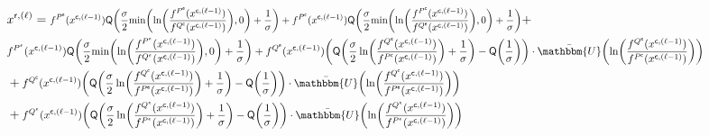 \documentclass[journal]{IEEEtran}
\newcommand{\mep}{{x}}
\newcommand{\row}{\mathsf{r}}
\newcommand{\col}{\mathsf{c}}
\newcommand{\Q}{\mathsf{Q}}
\newcommand{\Pue}{P^{\mathsf{e}}}
\newcommand{\Que}{Q^{\mathsf{e}}}
\newcommand{\Puc}{P^{\mathsf{c}}}
\newcommand{\Quc}{Q^{\mathsf{c}}}
\newcommand{\Puep}{P^{\mathsf{\epsilon}}}
\newcommand{\Quep}{Q^{\mathsf{\epsilon}}}
\let\originalleft\left
\let\originalright\right
\renewcommand{\left}{\mathopen{}\mathclose\bgroup\originalleft}
\renewcommand{\right}{\aftergroup\egroup\originalright}
\newcommand\scalemath[2]{\scalebox{#1}{\mbox{\ensuremath{\displaystyle #2}}}}   %
\begin{document}
\begin{figure*}[t]
	\vspace*{-20pt}
	\hrulefill		
	\begin{align}\label{xrl}
	& \nonumber \mep^{\row,(\ell)} = \scalemath{0.8}{f^{\Pue}(\mep^{\col,(\ell-1)}){\Q\left( { \frac{\sigma}{2}\text{min}\left(\ln \left( \frac{f^{\Pue}(\mep^{\col,(\ell-1)})}{f^{\Quc}(\mep^{\col,(\ell-1)})}\right),0\right)+\frac{1}{\sigma}} \right) } + f^{\Puc}(\mep^{\col,(\ell-1)}){\Q\left( { \frac{\sigma}{2}\text{min}\left(\ln \left( \frac{f^{\Puc}(\mep^{\col,(\ell-1)})}{f^{\Que}(\mep^{\col,(\ell-1)})}\right),0\right)+\frac{1}{\sigma}} \right) }} + \\ \nonumber &  \scalemath{0.85}{f^{\Puep}(\mep^{\col,(\ell-1)}){\Q\left( { \frac{\sigma}{2}\text{min}\left(\ln \left(\frac{f^{\Puep}(\mep^{\col,(\ell-1)})}{f^{\Quep}(\mep^{\col,(\ell-1)})}\right),0\right)+\frac{1}{\sigma}} \right) } + f^{\Que}(\mep^{\col,(\ell-1)})\left( {\Q\left( { \frac{\sigma}{2}\ln \left(\frac{f^{\Que}(\mep^{\col,(\ell-1)})}{f^{\Puc}(\mep^{\col,(\ell-1)})}\right)+\frac{1}{\sigma}} \right)}-\Q\left(\frac{1}{\sigma}\right) \right) \cdot \bar{\mathbbm{U}} \left( \ln \left(\frac{f^{\Que}(\mep^{\col,(\ell-1)})}{f^{\Puc}(\mep^{\col,(\ell-1)})}\right) \right)} \\ \nonumber & + \scalemath{0.85}{f^{\Quc}(\mep^{\col,(\ell-1)})\left( {\Q\left( { \frac{\sigma}{2}\ln \left(\frac{f^{\Quc}(\mep^{\col,(\ell-1)})}{f^{\Pue}(\mep^{\col,(\ell-1)})}\right)+\frac{1}{\sigma}} \right)}-\Q\left(\frac{1}{\sigma}\right) \right) \cdot \bar{\mathbbm{U}} \left( \ln \left(\frac{f^{\Quc}(\mep^{\col,(\ell-1)})}{f^{\Pue}(\mep^{\col,(\ell-1)})}\right) \right)} \\  & + \scalemath{0.85}{f^{\Quep}(\mep^{\col,(\ell-1)})\left( {\Q\left( { \frac{\sigma}{2}\ln \left(\frac{f^{\Quep}(\mep^{\col,(\ell-1)})}{f^{\Puep}(\mep^{\col,(\ell-1)})}\right)+\frac{1}{\sigma}} \right)}-\Q\left(\frac{1}{\sigma}\right) \right) \cdot \bar{\mathbbm{U}} \left( \ln \left(\frac{f^{\Quep}(\mep^{\col,(\ell-1)})}{f^{\Puep}(\mep^{\col,(\ell-1)})}\right) \right)}
	\end{align}
	\hrulefill
\end{figure*}
\end{document}
